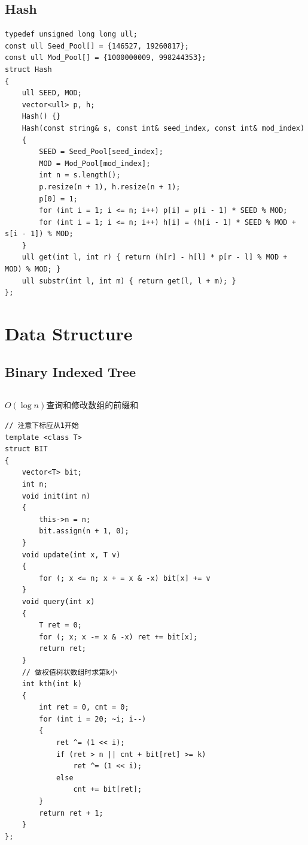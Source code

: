 \documentclass[twoside]{article}
\begin{document}
\subsection{Hash}
\begin{lstlisting}
typedef unsigned long long ull;
const ull Seed_Pool[] = {146527, 19260817};
const ull Mod_Pool[] = {1000000009, 998244353};
struct Hash
{
    ull SEED, MOD;
    vector<ull> p, h;
    Hash() {}
    Hash(const string& s, const int& seed_index, const int& mod_index)
    {
        SEED = Seed_Pool[seed_index];
        MOD = Mod_Pool[mod_index]; 
        int n = s.length();
        p.resize(n + 1), h.resize(n + 1);
        p[0] = 1;
        for (int i = 1; i <= n; i++) p[i] = p[i - 1] * SEED % MOD;
        for (int i = 1; i <= n; i++) h[i] = (h[i - 1] * SEED % MOD + s[i - 1]) % MOD;
    }
    ull get(int l, int r) { return (h[r] - h[l] * p[r - l] % MOD + MOD) % MOD; }
    ull substr(int l, int m) { return get(l, l + m); }
};\end{lstlisting}
\clearpage\section{Data Structure}
\subsection{Binary Indexed Tree}
\begin{lstlisting}
\end{lstlisting}
$O(\log n)$查询和修改数组的前缀和
\begin{lstlisting}
// 注意下标应从1开始
template <class T>
struct BIT
{
    vector<T> bit;
    int n;
    void init(int n)
    {
        this->n = n;
        bit.assign(n + 1, 0);
    }
    void update(int x, T v)
    {
        for (; x <= n; x + = x & -x) bit[x] += v
    }
    void query(int x)
    {
        T ret = 0;
        for (; x; x -= x & -x) ret += bit[x];
        return ret;
    }
    // 做权值树状数组时求第k小
    int kth(int k)
    {
        int ret = 0, cnt = 0;
        for (int i = 20; ~i; i--)
        {
            ret ^= (1 << i);
            if (ret > n || cnt + bit[ret] >= k)
                ret ^= (1 << i);
            else
                cnt += bit[ret];
        }
        return ret + 1;
    }
};\end{lstlisting}
\end{document}
